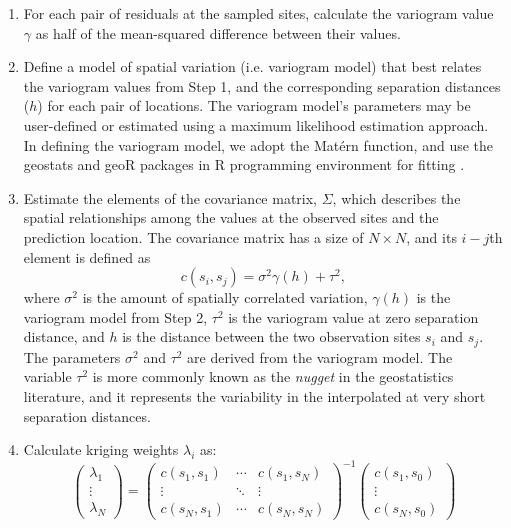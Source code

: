 \begin{enumerate}

    \item For each pair of residuals at the sampled sites, calculate the variogram value $\gamma$ as half of the mean-squared difference between their values. 
    
    \item Define a model of spatial variation (i.e. variogram model) that best relates the variogram values from Step 1, and the corresponding separation distances ($h$) for each pair of locations. The variogram model's parameters may be user-defined or estimated using a maximum likelihood estimation approach. In defining the variogram model, we adopt the Mat\'ern function, and use the geostats and geoR packages in R programming environment for fitting \citep{diggle2007, georpackage2001, geostatsRpkg, rpackage2006}. 
    
    \item Estimate the elements of the covariance matrix, $\Sigma$, which describes the spatial relationships among the values at the observed sites and the prediction location. The covariance matrix has a size of $N \times N$, and its $i-j$th element is defined as 
    \begin{equation}
    c(s_{i}, s_{j}) = \sigma^{2}\gamma(h) + \tau^2,
    \end{equation} \label{eq:cov}
    where $\sigma^2$ is the amount of spatially correlated variation, $\gamma(h)$ is the variogram model from Step 2, $\tau^2$ is the variogram value at zero separation distance, and $h$ is the distance between the two observation sites $s_{i}$ and $s_{j}$. The parameters $\sigma^2$ and $\tau^2$ are derived from the variogram model. The variable $\tau^2$ is more commonly known as the \textit{nugget} in the geostatistics literature, and it represents the variability in the interpolated at very short separation distances. 
    
    \item Calculate kriging weights $\lambda_{i}$ as:
    \begin{equation}
    \begin{pmatrix}
    \lambda_{1}\\ 
    \vdots \\ 
    \lambda_{N}
    \end{pmatrix}   = 
    \begin{pmatrix}
    c(s_{1}, s_{1}) &  \cdots & c(s_{1}, s_{N})  \\ 
    \vdots & \ddots  & \vdots\\ 
    c(s_{N}, s_{1}) & \cdots  & c(s_{N}, s_{N})  
    \end{pmatrix}^{-1}
    \begin{pmatrix}
    c(s_{1}, s_{0})\\ 
    \vdots \\ 
    c(s_{N}, s_{0})
    \end{pmatrix} 
    \end{equation} \label{eq:cov}    
    

\end{enumerate}
